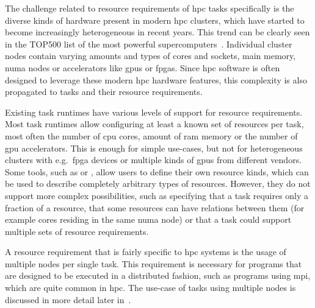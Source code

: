 The challenge related to resource requirements of \gls{hpc} tasks specifically is the
diverse kinds of hardware present in modern \gls{hpc} clusters, which have started to
become increasingly heterogeneous in recent years. This trend can be clearly seen in the TOP500
list of the most powerful supercomputers~\cite{top500analysis}. Individual cluster nodes contain
varying amounts and types of cores and sockets, main memory, \gls{numa} nodes or
accelerators like \glspl{gpu} or \glspl{fpga}. Since \gls{hpc}
software is often designed to leverage these modern \gls{hpc} hardware features, this
complexity is also propagated to tasks and their resource requirements.

Existing task runtimes have various levels of support for resource requirements. Most task runtimes
allow configuring at least a known set of resources per task, most often the number of
\gls{cpu} cores, amount of \gls{ram} memory or the number of
\gls{gpu} accelerators. This is enough for simple use-cases, but not for
heterogeneous clusters with e.g.\ \gls{fpga} devices or multiple kinds of
\glspl{gpu} from different vendors. Some tools, such as \dask{} or
\snakemake{}, allow users to define their own resource kinds, which can be used to
describe completely arbitrary types of resources. However, they do not support more complex
possibilities, such as specifying that a task requires only a fraction of a resource, that some
resources can have relations between them (for example cores residing in the same
\gls{numa} node) or that a task could support multiple sets of resource requirements.


A resource requirement that is fairly specific to \gls{hpc} systems is the usage of
multiple nodes per single task. This requirement is necessary for programs that are designed to be
executed in a distributed fashion, such as programs using \gls{mpi}, which are quite
common in \gls{hpc}. The use-case of tasks using multiple nodes is discussed in more
detail later in~.


